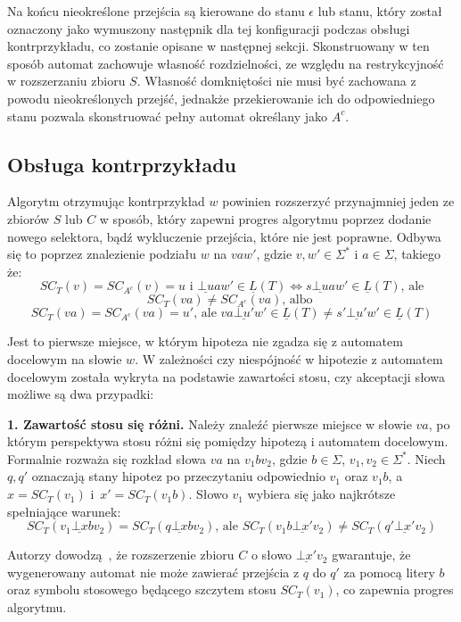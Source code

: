 Na końcu nieokreślone przejścia są kierowane do stanu $\epsilon$ lub stanu, który został oznaczony jako wymuszony następnik dla tej konfiguracji
podczas obsługi kontrprzykładu, co zostanie opisane w następnej sekcji. Skonstruowany w ten sposób automat zachowuje własność rozdzielności, ze względu na restrykcyjność w rozszerzaniu
zbioru $S$. Własność domkniętości nie musi być zachowana z powodu nieokreślonych przejść, jednakże przekierowanie ich do odpowiedniego stanu
pozwala skonstruować pełny automat określany jako $A^c$.

\subsection{Obsługa kontrprzykładu}
\label{chap:counterexample}

Algorytm otrzymując kontrprzykład $w$ powinien rozszerzyć przynajmniej jeden ze zbiorów $S$ lub $C$ w sposób, który zapewni progres algorytmu
poprzez dodanie nowego selektora, bądź wykluczenie przejścia, które nie jest poprawne. Odbywa się to poprzez znalezienie podziału $w$ na $vaw'$,
gdzie $v, w' \in \Sigma^*$ i $a \in \Sigma$, takiego że:
$$SC_T(v) = SC_{A^c}(v) = u \text{ i } \underline{\bot u}aw' \in \underline{L}(T) \Leftrightarrow s\underline{\bot u}aw' \in \underline{L}(T) \text{, ale}$$
$$SC_T(va) \neq SC_{A^c}(va) \text{, albo }$$
$$SC_{T}(va) = SC_{A^c}(va) = u' \text{, ale } va\underline{\bot u'}w' \in \underline{L}(T) \neq s' \underline{\bot u'}w' \in \underline{L}(T)$$

Jest to pierwsze miejsce, w którym hipoteza nie zgadza się z automatem docelowym na słowie $w$. W zależności czy niespójność w hipotezie z automatem
docelowym została wykryta na podstawie zawartości stosu, czy akceptacji słowa możliwe są dwa przypadki:

\textbf{1. Zawartość stosu się różni.} Należy znaleźć pierwsze miejsce w słowie $va$, po którym perspektywa stosu różni się pomiędzy
hipotezą i automatem docelowym. Formalnie rozważa się rozkład słowa $va$ na $v_1bv_2$, gdzie $b \in \Sigma$, $v_1, v_2 \in \Sigma^*$.
Niech $q, q'$ oznaczają stany hipotez po przeczytaniu odpowiednio $v_1$ oraz $v_1b$, a $x = SC_T(v_1)$ i~$x' = SC_T(v_1b)$.
Słowo $v_1$ wybiera się jako najkrótsze spełniające warunek:
$$SC_T(v_1 \underline{\bot x}bv_2) = SC_T(q \underline{\bot x}bv_2) \text{, ale } SC_T(v_1b \underline{\bot x'}v_2) \neq SC_T(q' \underline{\bot x'}v_2)$$

Autorzy dowodzą~\cite[Lemma 15]{main}, że rozszerzenie zbioru $C$ o słowo $\underline{\bot x'}v_2$ gwarantuje, że wygenerowany automat nie może
zawierać przejścia z $q$ do $q'$ za pomocą litery $b$ oraz symbolu stosowego będącego szczytem stosu $SC_T(v_1)$, co zapewnia progres algorytmu.


